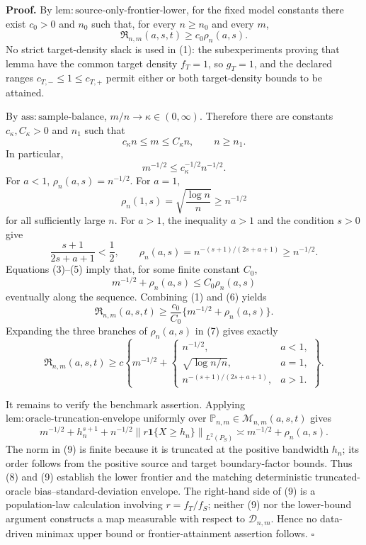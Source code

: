 \textbf{Proof.}
By \(\mathrm{lem:source\text{-}only\text{-}frontier\text{-}lower}\), for the fixed model constants there exist \(c_0>0\) and \(n_0\) such that, for every \(n\ge n_0\) and every \(m\),
\[
 \mathfrak R_{n,m}(a,s,t)\ge c_0\rho_n(a,s).
\tag{1}
\]
No strict target-density slack is used in (1): the subexperiments proving that lemma have the common target density \(f_T=1\), so \(g_T=1\), and the declared ranges \(c_{T,-}\le1\le c_{T,+}\) permit either or both target-density bounds to be attained.

By \(\mathrm{ass:sample\text{-}balance}\), \(m/n\to\kappa\in(0,\infty)\).  Therefore there are constants \(c_\kappa,C_\kappa>0\) and \(n_1\) such that
\[
 c_\kappa n\le m\le C_\kappa n,
 \qquad n\ge n_1.
\tag{2}
\]
In particular,
\[
 m^{-1/2}\le c_\kappa^{-1/2}n^{-1/2}.
\tag{3}
\]
For \(a<1\), \(\rho_n(a,s)=n^{-1/2}\).  For \(a=1\),
\[
 \rho_n(1,s)=\sqrt{\frac{\log n}{n}}\ge n^{-1/2}
\tag{4}
\]
for all sufficiently large \(n\).  For \(a>1\), the inequality \(a>1\) and the condition \(s>0\) give
\[
 \frac{s+1}{2s+a+1}<\frac12,
 \qquad
 \rho_n(a,s)=n^{-(s+1)/(2s+a+1)}\ge n^{-1/2}.
\tag{5}
\]
Equations (3)--(5) imply that, for some finite constant \(C_0\),
\[
 m^{-1/2}+\rho_n(a,s)\le C_0\rho_n(a,s)
\tag{6}
\]
eventually along the sequence.  Combining (1) and (6) yields
\[
 \mathfrak R_{n,m}(a,s,t)
 \ge \frac{c_0}{C_0}\{m^{-1/2}+\rho_n(a,s)\}.
\tag{7}
\]
Expanding the three branches of \(\rho_n(a,s)\) in (7) gives exactly
\[
 \mathfrak R_{n,m}(a,s,t)\ge c\left\{m^{-1/2}+
 \begin{cases}
 n^{-1/2},&a<1,\\
 \sqrt{\log n/n},&a=1,\\
 n^{-(s+1)/(2s+a+1)},&a>1.
 \end{cases}\right\}.
\tag{8}
\]

It remains to verify the benchmark assertion.  Applying \(\mathrm{lem:oracle\text{-}truncation\text{-}envelope}\) uniformly over \(\mathbb P_{n,m}\in\mathcal M_{n,m}(a,s,t)\) gives
\[
 m^{-1/2}+h_n^{s+1}+n^{-1/2}
 \left\|r\mathbf 1\{X\ge h_n\}\right\|_{L^2(P_S)}
 \asymp m^{-1/2}+\rho_n(a,s).
\tag{9}
\]
The norm in (9) is finite because it is truncated at the positive bandwidth \(h_n\); its order follows from the positive source and target boundary-factor bounds.  Thus (8) and (9) establish the lower frontier and the matching deterministic truncated-oracle bias--standard-deviation envelope.  The right-hand side of (9) is a population-law calculation involving \(r=f_T/f_S\); neither (9) nor the lower-bound argument constructs a map measurable with respect to \(\mathcal D_{n,m}\).  Hence no data-driven minimax upper bound or frontier-attainment assertion follows. \(\square\)